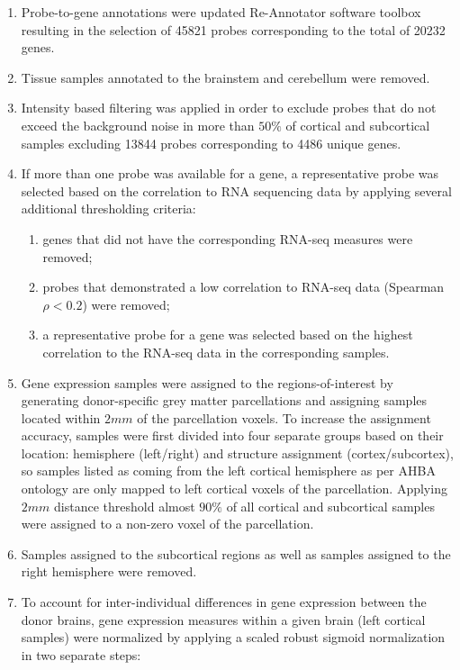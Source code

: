 \begin{enumerate}\addtocounter{enumii}{5}%
      \item Probe-to-gene annotations were updated Re-Annotator software toolbox \citep{Arloth2015} resulting in the selection of \num{45821} probes corresponding to the total of \num{20232} genes. 
      \item Tissue samples annotated to the brainstem and cerebellum were removed. 
      \item Intensity based filtering was applied in order to exclude probes that do not exceed the background noise in more than $50\%$ of cortical and subcortical samples excluding \num{13 844} probes corresponding to \num{4486} unique genes. 
      \item If more than one probe was available for a gene, a representative probe was selected based on the correlation to RNA sequencing data \citep{Miller2014a} by applying several additional thresholding criteria:
      \begin{enumerate}
      \item genes that did not have the corresponding RNA-seq measures were removed;
      \item probes that demonstrated a low correlation to RNA-seq data (Spearman $\rho<0.2$) were removed;
	  \item a representative probe for a gene was selected based on the highest correlation to the RNA-seq data in the corresponding samples.	      
      \end{enumerate}
      \item Gene expression samples were assigned to the regions-of-interest by generating donor-specific grey matter parcellations and assigning samples located within $2mm$ of the parcellation voxels. To increase the assignment accuracy, samples were first divided into four separate groups based on their location: hemisphere (left/right) and structure assignment (cortex/subcortex), so samples listed as coming from the left cortical hemisphere as per AHBA ontology are only mapped to left cortical voxels of the parcellation. Applying $2mm$ distance threshold almost $90\%$ of all cortical and subcortical samples were assigned to a non-zero voxel of the parcellation. 
      \item Samples assigned to the subcortical regions as well as samples assigned to the right hemisphere were removed. 
      \item To account for inter-individual differences in gene expression between the donor brains, gene expression measures within a given brain (left cortical samples) were normalized by applying a scaled robust sigmoid normalization \citep{Arnatkeviciute2019} in two separate steps: 

\end{enumerate}
